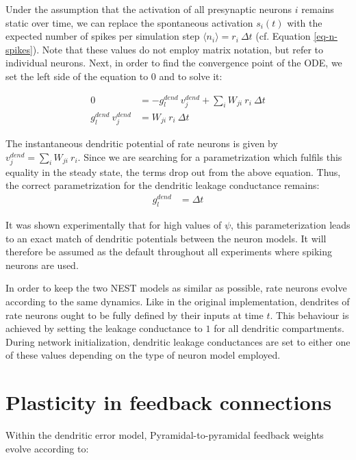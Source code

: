 Under the assumption that the activation of all presynaptic neurons $i$ remains static over time, we can replace the
spontaneous activation $s_i(t)$ with the expected number of spikes per simulation step $\langle \textit{n}_i \rangle =
  r_i \ \Delta t$ (cf. Equation \ref{eq-n-spikes}). Note that these values do not employ matrix notation, but refer to
individual neurons. Next, in order to find the convergence point of the ODE, we set the left side of the equation to $0$
and to solve it:

\begin{align}
  0                        & = -g_l^{dend} \  v_j^{dend} + \sum_i W_{ji} \    r_i \ \Delta t \\
  g_l^{dend} \  v_j^{dend} & = W_{ji} \    r_i \ \Delta t
\end{align}

The instantaneous dendritic potential of rate neurons is given by $v_j^{dend} = \sum_i W_{ji} \ r_i$. Since we are
searching for a parametrization which fulfils this equality in the steady state, the terms drop out from the above
equation. Thus, the correct parametrization for the dendritic leakage conductance remains:
\begin{align}
  g_l^{dend} & = \Delta t
\end{align}

It was shown experimentally that for high values of $\psi$, this parameterization leads to an exact match of dendritic
potentials between the neuron models. It will therefore be assumed as the default throughout all experiments where
spiking neurons are used. \newline

In order to keep the two NEST models as similar as possible, rate neurons evolve according to the same dynamics. Like in
the original implementation, dendrites of rate neurons ought to be fully defined by their inputs at time $t$. This
behaviour is achieved by setting the leakage conductance to $1$ for all dendritic compartments. During network
initialization, dendritic leakage conductances are set to either one of these values depending on the type of neuron
model employed.


\section{Plasticity in feedback connections}\label{sec-feedback-plast}

Within the dendritic error model, Pyramidal-to-pyramidal feedback weights evolve according to:


